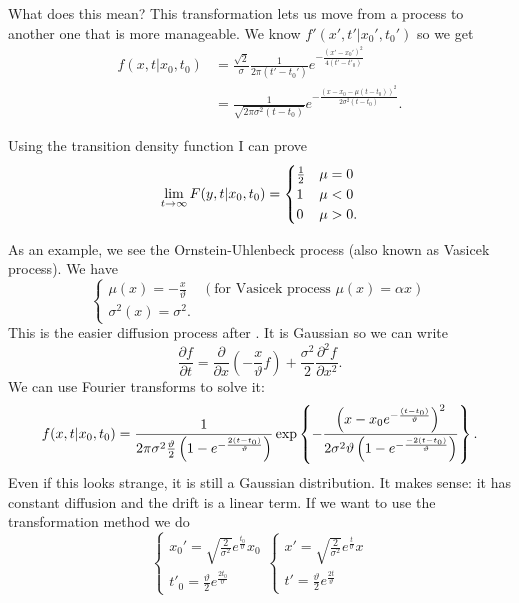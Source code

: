 \documentclass[12pt]{report}
\begin{document}
What does this mean? This transformation lets us move from a process to another one that is more manageable. We know $f'(x',t'|x_{0}',t_{0}')$ so we get
\begin{align*}
	f(x,t|x_{0},t_{0})&=\frac{\sqrt{2}}{\sigma}\frac{1}{2\pi(t'-t_{0}')}e^{-\frac{(x'-x_{0}')^{2}}{4(t'-t'_{0})}}\\
	&=\frac{1}{\sqrt{2\pi\sigma^{2}(t-t_{0})}}e^{-\frac{(x-x_{0}-\mu(t-t_{0}))^{2}}{2\sigma^{2}(t-t_{0})}}.
\end{align*}
\begin{remark}
	Using the transition density function I can prove
	\begin{equation*}
		\lim_{t\to\infty} F(y,t|x_{0},t_{0})=\begin{cases}
			\frac{1}{2}&\mu=0\\
			1&\mu<0\\
			0&\mu>0.
		\end{cases}
	\end{equation*}
\end{remark}
As an example, we see the Ornstein-Uhlenbeck process (also known as Vasicek process). We have
\begin{equation*}
	\begin{cases}
		\mu(x)=-\frac{x}{\vartheta}&(\text{for Vasicek process }\mu(x)=\alpha x)\\
		\sigma^{2}(x)=\sigma^{2}.	\end{cases}
\end{equation*}
This is the easier diffusion process after \bwm. It is Gaussian so we can write
\begin{equation*}
	\frac{\partial f}{\partial t}=\frac{\partial}{\partial x}\left(-\frac{x}{\vartheta}f\right)+\frac{\sigma^{2}}{2}\frac{\partial^{2}f}{\partial x^{2}}.
\end{equation*}
We can use Fourier transforms to solve it:
\begin{equation*}
	f(x,t|x_{0},t_{0})=\frac{1}{2\pi\sigma^{2}\frac{\vartheta}{2}\left(1-e^{-\frac{2(t-t_{0})}{\vartheta}}\right)}\exp\left\{-\frac{\left(x-x_{0}e^{-\frac{(t-t_{0})}{\vartheta}}\right)^{2}}{2\sigma^{2}\vartheta\left(1-e^{-\frac{-2(t-t_{0})}{\vartheta}}\right)}\right\}.
\end{equation*}
Even if this looks strange, it is still a Gaussian distribution. It makes sense: it has constant diffusion and the drift is a linear term. If we want to use the transformation method we do
\begin{equation*}
	\begin{cases}
		x_{0}'=\sqrt{\frac{2}{\sigma^{2}}}e^{\frac{t_{0}}{\vartheta}}x_{0}\\
		t'_{0}=\frac{\vartheta}{2}e^{\frac{2t_{0}}{\vartheta}}
	\end{cases}
		\begin{cases}
		x'=\sqrt{\frac{2}{\sigma^{2}}}e^{\frac{t}{\vartheta}}x\\
		t'=\frac{\vartheta}{2}e^{\frac{2t}{\vartheta}}
	\end{cases}
\end{equation*}
\end{document}
